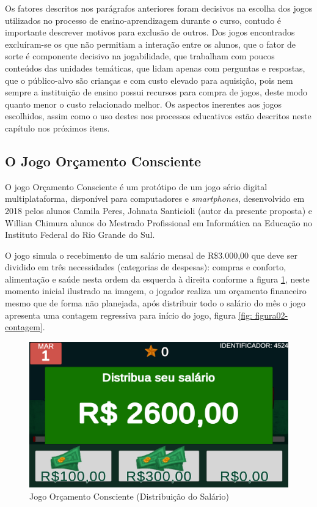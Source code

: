 Os fatores descritos nos parágrafos anteriores foram decisivos na escolha dos jogos utilizados no processo de ensino-aprendizagem durante o curso, contudo é importante descrever motivos para exclusão de outros. Dos jogos encontrados excluíram-se os que não permitiam a interação entre os alunos, que o fator de sorte é componente decisivo na jogabilidade, que trabalham com poucos conteúdos das unidades temáticas, que lidam apenas com perguntas e respostas, que o público-alvo são crianças e com custo elevado para aquisição, pois nem sempre a instituição de ensino possui recursos para compra de jogos, deste modo quanto menor o custo relacionado melhor. Os aspectos inerentes aos jogos escolhidos, assim como o uso destes nos processos educativos estão descritos neste capítulo nos próximos itens.

\subsection{O Jogo Orçamento Consciente}
O jogo Orçamento Consciente é um protótipo de um jogo sério digital multiplataforma, disponível para computadores e \textit{smartphones}, desenvolvido em 2018 pelos alunos Camila Peres, Johnata Santicioli (autor da presente proposta) e Willian Chimura alunos do Mestrado Profissional em Informática na Educação no Instituto Federal do Rio Grande do Sul.

O jogo simula o recebimento de um salário mensal de R\$3.000,00 que deve ser dividido em três necessidades (categorias de despesas): compras e conforto, alimentação e saúde nesta ordem da esquerda à direita conforme a figura \ref{fig: figura01-salario}, neste momento inicial ilustrado na imagem, o jogador realiza um orçamento financeiro mesmo que de forma não planejada, após distribuir todo o salário do mês o jogo apresenta uma contagem regressiva para início do jogo, figura \ref{fig: figura02-contagem}.

\graphicspath{{figuras/}}
\begin{figure}[!ht]
\centering
\begin{minipage}{1.\linewidth}
\center
\caption{Jogo Orçamento Consciente (Distribuição do Salário)} \label{fig: figura01-salario}
\includegraphics[width=0.4\linewidth]{01-figura_distribuicao-salario.png}
\end{minipage}
\end{figure}

